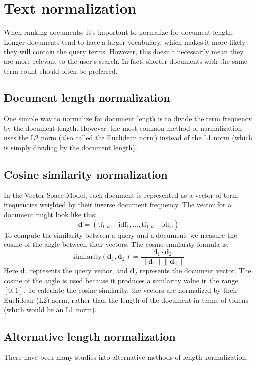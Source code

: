 \section{Text normalization}

When ranking documents, it's important to normalize for document length. 
Longer documents tend to have a larger vocabulary, which makes it more likely they will contain the query terms.
However, this doesn't necessarily mean they are more relevant to the user's search. In fact, shorter documents with the same term count should often be preferred.

\subsection{Document length normalization}
One simple way to normalize for document length is to divide the term frequency by the document length. 
However, the most common method of normalization uses the L2 norm (also called the Euclidean norm) instead of the L1 norm (which is simply dividing by the document length).

\subsection{Cosine similarity normalization}
In the Vector Space Model, each document is represented as a vector of term frequencies weighted by their inverse document frequency. 
The vector for a document might look like this:
\[\mathbf{d}=(\text{tf}_{1,d}-\text{idf}_1,\dots,\text{tf}_{1,d}-\text{idf}_n)\]
\noindent To compute the similarity between a query and a document, we measure the cosine of the angle between their vectors. 
The cosine similarity formula is:
\[\text{similarity}(\mathbf{d}_1,\mathbf{d}_2)=\dfrac{\mathbf{d}_1\cdot\mathbf{d}_2}{\left\lVert \mathbf{d}_1\right\rVert\left\lVert \mathbf{d}_2\right\rVert  }\]
Here $\mathbf{d}_1$ represents the query vector, and $\mathbf{d}_2$ represents the document vector.
The cosine of the angle is used because it produces a similarity value in the range $[0,1]$. 
To calculate the cosine similarity, the vectors are normalized by their Euclidean (L2) norm, rather than the length of the document in terms of tokens (which would be an L1 norm).

\subsection{Alternative length normalization}
There have been many studies into alternative methods of length normalization. 


